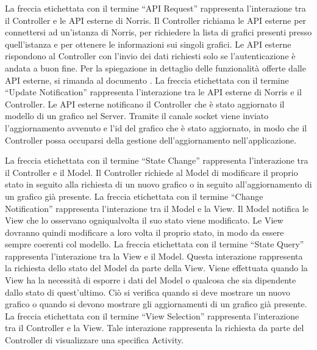 	    La freccia etichettata con il termine “API Request” rappresenta l'interazione tra il Controller e le API esterne di Norris. Il Controller richiama le API esterne per connettersi ad un'istanza di Norris, per richiedere la lista di grafici presenti presso quell'istanza e per ottenere le informazioni sui singoli grafici. Le API esterne rispondono al Controller con l'invio dei dati richiesti solo se l'autenticazione è andata a buon fine. Per la spiegazione in dettaglio delle funzionalità offerte dalle API esterne, si rimanda al documento .
	   	La freccia etichettata con il termine “Update Notification” rappresenta l'interazione tra le API esterne di Norris e il Controller. Le API esterne notificano il Controller che è stato aggiornato il modello di un grafico nel Server. Tramite il canale socket viene inviato l'aggiornamento avvenuto e l'id del grafico che è stato aggiornato, in modo che il Controller possa occuparsi della gestione dell'aggiornamento nell'applicazione.
	    	
	    La freccia etichettata con il termine “State Change” rappresenta l'interazione tra il Controller e il Model. Il Controller richiede al Model di modificare il proprio stato in seguito alla richiesta di un nuovo grafico o in seguito all'aggiornamento di un grafico già presente.
	   	La freccia etichettata con il termine “Change Notification” rappresenta l'interazione tra il Model e la View. Il Model notifica le View che lo osservano ogniqualvolta il suo stato viene modificato. Le View dovranno quindi modificare a loro volta il proprio stato, in modo da essere sempre coerenti col modello.
	   	La freccia etichettata con il termine “State Query” rappresenta l'interazione tra la View e il Model. Questa interazione rappresenta la richiesta dello stato del Model da parte della View. Viene effettuata quando la View ha la necessità di esporre i dati del Model o qualcosa che sia dipendente dallo stato di quest'ultimo. Ciò si verifica quando si deve mostrare un nuovo grafico o quando si devono mostrare gli aggiornamenti di un grafico già presente.
	   	La freccia etichettata con il termine “View Selection” rappresenta l'interazione tra il Controller e la View. Tale interazione rappresenta la richiesta da parte del Controller di visualizzare una specifica Activity.

